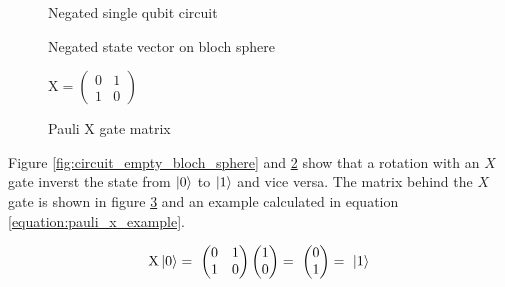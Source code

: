\begin{figure}[!h]
    \centering
    \caption{Negated single qubit circuit}
    \label{fig:circuit_negated_empty}
\end{figure}

\begin{figure}[!h]
    \centering
    \caption{Negated state vector on bloch sphere}
    \label{fig:circuit_negated_empty_bloch_sphere}
\end{figure}

\newpage

\begin{figure}
    \centering
    $\mathrm{X} = \begin{pmatrix}
        0 & 1 \\
        1 & 0
    \end{pmatrix}$
    \caption{Pauli X gate matrix}
    \label{fig:matrix_pauli_x}
\end{figure}

Figure \ref{fig:circuit_empty_bloch_sphere} and \ref{fig:circuit_negated_empty_bloch_sphere} show that a rotation with an $X$ gate inverst the state from $\ket{0}$ to $\ket{1}$ and vice versa. The matrix behind the $X$ gate\cite{qiskit_xgate_nodate} is shown in figure \ref{fig:matrix_pauli_x} and an example calculated in equation \ref{equation:pauli_x_example}.

\begin{equation}
    \centering
    \begin{split}
        \mathrm{X}\ket{0} =\ \begin{pmatrix} 0 & 1 \\ 1 & 0 \end{pmatrix}\begin{pmatrix}1 \\ 0\end{pmatrix} =\ \begin{pmatrix}0 \\ 1\end{pmatrix} =\ \ket{1}
    \end{split}
    \label{equation:pauli_x_example}
\end{equation}

